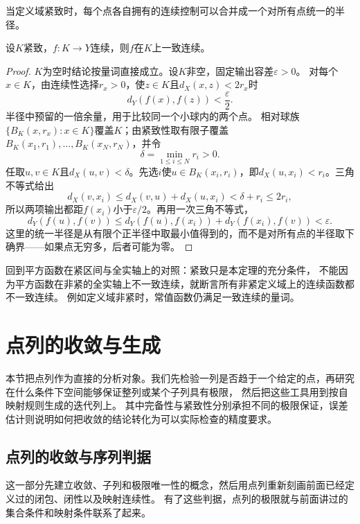当定义域紧致时，每个点各自拥有的连续控制可以合并成一个对所有点统一的半径。

\begin{theorem}
\label{thm:metric-heine-cantor}
设$K$紧致，$f:K\to Y$连续，则$f$在$K$上一致连续。
\end{theorem}

\begin{proof}
$K$为空时结论按量词直接成立。设$K$非空，固定输出容差$\varepsilon>0$。
对每个$x\in K$，由连续性选择$r_x>0$，使$z\in K$且$d_X(x,z)<2r_x$时
\[
  d_Y(f(x),f(z))<\frac{\varepsilon}{2}.
\]
半径中预留的一倍余量，用于比较同一个小球内的两个点。
相对球族$\{B_K(x,r_x):x\in K\}$覆盖$K$；由紧致性取有限子覆盖
$B_K(x_1,r_1),\ldots,B_K(x_N,r_N)$，并令
\[
  \delta=\min_{1\leq i\leq N}r_i>0.
\]
任取$u,v\in K$且$d_X(u,v)<\delta$。先选$i$使$u\in B_K(x_i,r_i)$，即$d_X(u,x_i)<r_i$。三角不等式给出
\[
  d_X(v,x_i)\leq d_X(v,u)+d_X(u,x_i)<\delta+r_i\leq2r_i,
\]
所以两项输出都距$f(x_i)$小于$\varepsilon/2$。再用一次三角不等式，
\[
  d_Y(f(u),f(v))
  \leq d_Y(f(u),f(x_i))+d_Y(f(x_i),f(v))<\varepsilon.
\]
这里的统一半径是从有限个正半径中取最小值得到的，而不是对所有点的半径取下确界——如果点无穷多，后者可能为零。
\end{proof}

回到平方函数在紧区间与全实轴上的对照：紧致只是本定理的充分条件，
不能因为平方函数在非紧的全实轴上不一致连续，就断言所有非紧定义域上的连续函数都不一致连续。
例如定义域非紧时，常值函数仍满足一致连续的量词。

\section{点列的收敛与生成}
\label{sec:metric-sequence-limits}

本节把点列作为直接的分析对象。我们先检验一列是否趋于一个给定的点，再研究在什么条件下空间能够保证整列或某个子列具有极限，
然后把这些工具用到按自映射规则生成的迭代列上。
其中完备性与紧致性分别承担不同的极限保证，误差估计则说明如何把收敛的结论转化为可以实际检查的精度要求。

\subsection{点列的收敛与序列判据}
\label{sec:metric-convergent-sequences}

这一部分先建立收敛、子列和极限唯一性的概念，然后用点列重新刻画前面已经定义过的闭包、闭性以及映射连续性。
有了这些判据，点列的极限就与前面讲过的集合条件和映射条件联系了起来。

